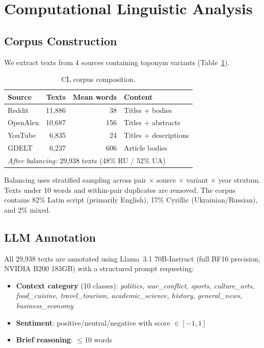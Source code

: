\documentclass{article}
\begin{document}
\section{Computational Linguistic Analysis}
\label{sec:cl}

\subsection{Corpus Construction}

We extract texts from 4 sources containing toponym variants (Table~\ref{tab:cl-corpus}).

\begin{table}[t]
\centering
\small
\caption{CL corpus composition.}
\label{tab:cl-corpus}
\begin{tabular}{lrrl}
\toprule
\textbf{Source} & \textbf{Texts} & \textbf{Mean words} & \textbf{Content} \\
\midrule
Reddit & 11,886 & 38 & Titles + bodies \\
OpenAlex & 10,687 & 156 & Titles + abstracts \\
YouTube & 6,835 & 24 & Titles + descriptions \\
GDELT & 6,237 & 606 & Article bodies \\
\midrule
\multicolumn{4}{l}{\textit{After balancing:} 29,938 texts (48\% RU / 52\% UA)} \\
\bottomrule
\end{tabular}
\end{table}

Balancing uses stratified sampling across pair $\times$ source $\times$ variant $\times$ year stratum. Texts under 10 words and within-pair duplicates are removed. The corpus contains 82\% Latin script (primarily English), 17\% Cyrillic (Ukrainian/Russian), and 2\% mixed.

\subsection{LLM Annotation}

All 29,938 texts are annotated using Llama~3.1 70B-Instruct (full BF16 precision, NVIDIA B200 183GB) with a structured prompt requesting:

\begin{itemize}
\item \textbf{Context category} (10 classes): \textit{politics, war\_conflict, sports, culture\_arts, food\_cuisine, travel\_tourism, academic\_science, history, general\_news, business\_economy}
\item \textbf{Sentiment}: positive/neutral/negative with score $\in [-1, 1]$
\item \textbf{Brief reasoning}: $\leq$10 words
\end{itemize}
\end{document}

